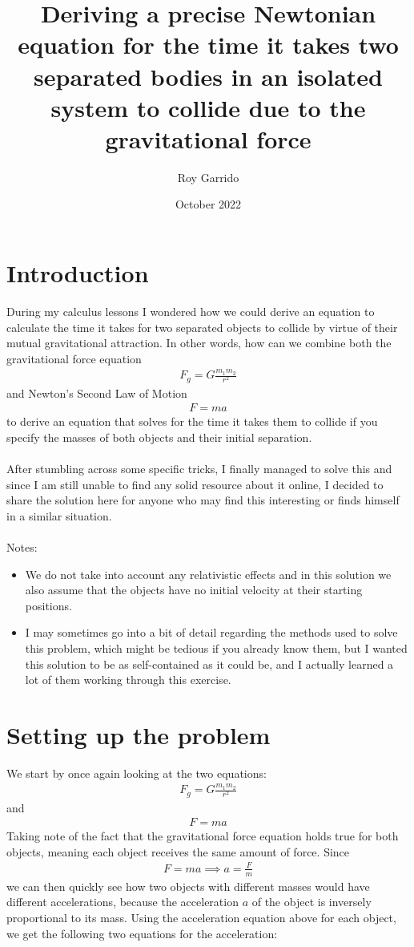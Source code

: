 \documentclass{article}
\title{Deriving a precise Newtonian equation for the time it takes two separated bodies in an isolated system to collide due to the gravitational force}
\author{Roy Garrido }
\date{October 2022}
\begin{document}
\maketitle

\section{Introduction}
During my calculus lessons I wondered how we could derive an equation to calculate the time it takes for two separated objects to collide by virtue of their mutual gravitational attraction. In other words, how can we combine both the gravitational force equation
\begin{align}
    F_g = G \frac{m_1 m_2}{r^2}
\end{align}
and Newton's Second Law of Motion
\begin{align}
    F = ma
\end{align}
to derive an equation that solves for the time it takes them to collide if you specify the masses of both objects and their initial separation.
\\
\\
After stumbling across some specific tricks, I finally managed to solve this and since I am still unable to find any solid resource about it online, I decided to share the solution here for anyone who may find this interesting or finds himself in a similar situation.
\\
\\
Notes:
\begin{itemize}
    \item We do not take into account any relativistic effects and in this solution we also assume that the objects have no initial velocity at their starting positions.
    \item I may sometimes go into a bit of detail regarding the methods used to solve this problem, which might be tedious if you already know them, but I wanted this solution to be as self-contained as it could be, and I actually learned a lot of them working through this exercise.
\end{itemize}

\newpage
\section{Setting up the problem}
We start by once again looking at the two equations:
\begin{align}
    F_g = G \frac{m_1 m_2}{r^2}
\end{align}
and
\begin{align}
    F = ma
\end{align}
Taking note of the fact that the gravitational force equation holds true for both objects, meaning each object receives the same amount of force. Since
\begin{align}
    F = ma \implies a = \frac{F}{m}
\end{align}
    we can then quickly see how two objects with different masses would have different accelerations, because the acceleration $a$ of the object is inversely proportional to its mass. Using the acceleration equation above for each object, we get the following two equations for the acceleration:
\end{document}
